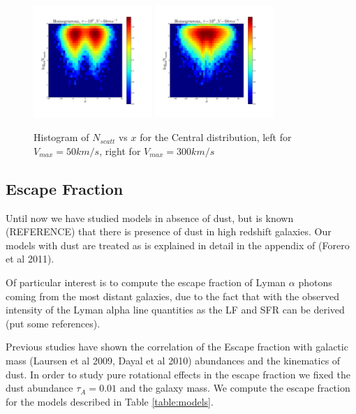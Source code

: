 \documentclass[usenatbib]{mn2e}
\begin{document}
\begin{figure}
     \includegraphics[width=0.40\textwidth]{2dHistogram50t5.png}
     \includegraphics[width=0.40\textwidth]{2dHistogram300t5.png}
    
    \caption{Histogram of $N_{scatt}$ vs $x$ for the Central distribution, left for $V_{max}=50km/s $, right for $V_{max}=300km/s$ \label{fig:NscattHistoHOM}} 
\end{figure}


\subsection{Escape Fraction}
\label{sec:EF}

Until now we have studied models in absence of dust, but is known (REFERENCE) 
that there is presence of dust in high redshift galaxies. Our models with 
dust are treated as is explained in detail in  the appendix of (Forero et al 2011).  

Of particular interest is to compute the escape fraction of Lyman $\alpha$ 
photons coming from the most distant galaxies, due to the fact that with the 
observed intensity of the Lyman alpha line quantities as the LF and SFR can 
be derived (put some references).

Previous studies have shown the correlation of the Escape fraction with galactic 
mass (Laursen et al 2009, Dayal et al 2010) abundances and the kinematics of dust. 
In order to study pure rotational effects in the escape fraction we fixed the dust 
abundance $\tau_{A}=0.01$ and the galaxy mass. We compute the escape fraction for 
the models described in Table \ref{table:models}.
\end{document}
